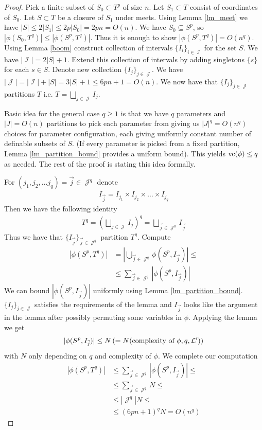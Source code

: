 \documentclass{amsart}
\DeclareMathOperator{\I}{\mathcal I}
\DeclareMathOperator{\J}{\mathcal J}
\begin{document}
\begin{proof}
	Pick a finite subset of $S_0 \subset T^p$ of size $n$. Let $S_1 \subset T$ consist of coordinates of $S_0$. Let $S \subset T$ be a closure of $S_1$ under meets. Using Lemma \ref{lm_meet} we have $|S| \leq 2|S_1| \leq 2p|S_0| = 2pn = O(n)$. We have $S_0 \subseteq S^p$, so $|\phi(S_0, T^q)| \leq |\phi(S^p, T^q)|$. Thus it is enough to show $|\phi(S^p, T^q)| = O(n^q)$.
	Using Lemma \ref{boom} construct collection of intervals $\{I_i\}_{i \in \I}$ for the set $S$. We have $|\I| = 2|S| + 1$. Extend this collection of intervals by adding singletons $\{s\}$ for each $s \in S$. Denote new collection $\{I_j\}_{j \in \J}$. We have $|\J| = |\I| + |S| = 3|S| + 1 \leq 6pn + 1 = O(n)$. We now have that $\{I_j\}_{j \in \J}$ partitions $T$ i.e. $T = \bigsqcup_{j \in \J} I_j$.
	
	Basic idea for the general case $q \geq 1$ is that we have $q$ parameters and $|J| = O(n)$ partitions to pick each parameter from giving us $|J|^q = O(n^q)$ choices for parameter configuration, each giving uniformly constant number of definable subsets of $S$. (If every parameter is picked from a fixed partition, Lemma \ref{lm_partition_bound} provides a uniform bound). This yields $\operatorname{vc}(\phi) \leq q$ as needed. The rest of the proof is stating this idea formally.
	
	For $(j_1, j_2, \ldots j_q) = \vec j \in \J^q$ denote 
	\begin{align*}
		I_{\vec j} = I_{j_1} \times I_{j_2} \times \ldots \times I_{j_q}
	\end{align*}
	Then we have the following identity
	\begin{align*}
		T^q = (\bigsqcup_{j \in \J} I_j)^q = \bigsqcup_{\vec j \in \J^q} I_{\vec j}
	\end{align*}
	Thus we have that $\{I_{\vec j}\}_{\vec j \in \J^q}$ partition $T^q$. Compute
	\begin{align*}
		|\phi(S^p, T^q)|
		&= \left|\bigcup_{\vec j \in \J^q} \phi(S^p, I_{\vec j}) \right| \leq \\
		&\leq \sum_{\vec j \in \J^q} |\phi(S^p, I_{\vec j})|
	\end{align*}
	We can bound $|\phi(S^p, I_{\vec j})|$ uniformly using Lemma \ref{lm_partition_bound}. $\{I_j\}_{j \in \J}$ satisfies the requirements of the lemma and $I_{\vec j}$ looks like the argument in the lemma after possibly permuting some variables in $\phi$. Applying the lemma we get
	\begin{align*}
		|\phi(S^p, I_{\vec j})| \leq N \left(= N(\text{complexity of $\phi$}, q, \mathcal L')\right)
	\end{align*}
	with $N$ only depending on $q$ and complexity of $\phi$. We complete our computation
	\begin{align*}
		|\phi(S^p, T^q)|
		&\leq \sum_{\vec j \in \J^q} |\phi(S^p, I_{\vec j})| \leq \\
		&\leq \sum_{\vec j \in \J^q} N \leq \\
		&\leq |\J^q| N \leq \\
		&\leq (6pn + 1)^q N = O(n^q)
	\end{align*}
	\end{proof}
\end{document}
